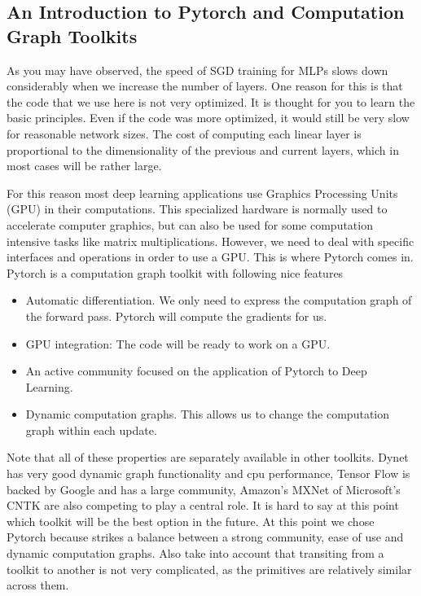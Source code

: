 \subsection{An Introduction to Pytorch and Computation Graph Toolkits}

As you may have observed, the speed of SGD training for MLPs slows down
considerably when we increase the number of layers. One reason for this is that
the code that we use here is not very optimized. It is thought for you to
learn the basic principles. Even if the code was more optimized, it would still be
very slow for reasonable network sizes. The cost of computing each
linear layer is proportional to the dimensionality of the previous and current
layers, which in most cases will be rather large.

For this reason most deep learning applications use Graphics Processing Units
(GPU) in their computations. This specialized hardware is normally used to
accelerate computer graphics, but can also be used for some computation
intensive tasks like matrix multiplications. However, we need to deal with
specific interfaces and operations in order to use a GPU. This is where Pytorch
comes in. Pytorch is a computation graph toolkit with following nice features

\begin{itemize}
\item Automatic differentiation. We only need to express the computation graph of the forward pass. Pytorch will compute the gradients for us. 
\item GPU integration: The code will be ready to work on a GPU.
\item An active community focused on the application of Pytorch to Deep Learning.
\item Dynamic computation graphs. This allows us to change the computation graph within each update. 
\end{itemize}

Note that all of these properties are separately available in other toolkits. Dynet
has very good dynamic graph functionality and cpu performance, Tensor Flow is
backed by Google and has a large community, Amazon's MXNet of Microsoft's CNTK
are also competing to play a central role. It is hard to say at this point
which toolkit will be the best option in the future. At this point we chose Pytorch 
because strikes a balance between a strong community, ease of use and
dynamic computation graphs. Also take into account that transiting from a
toolkit to another is not very complicated, as the primitives are relatively
similar across them.


